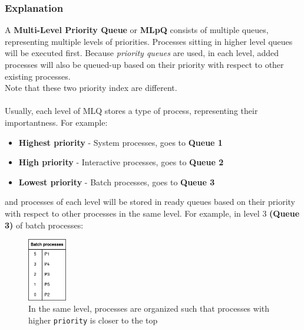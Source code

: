\documentclass[]{article}
\begin{document}
\subsubsection{Explanation}
A \textbf{Multi-Level Priority Queue} or \textbf{MLpQ} consists of multiple queues, representing multiple levels of priorities. Processes sitting in higher level queues will be executed first. Because \textit{priority queues} are used, in each level, added processes will also be queued-up based on their priority with respect to other existing processes.
\\
Note that these two priority index are different.\\
\\
Usually, each level of MLQ stores a type of process, representing their importantness. For example:
\begin{itemize}
	\item \textbf{Highest priority} - System processes, goes to \textbf{Queue 1}
	\item \textbf{High priority} - Interactive processes, goes to \textbf{Queue 2}
	\item \textbf{Lowest priority} - Batch processes, goes to \textbf{Queue 3}
\end{itemize}
and processes of each level will be stored in ready queues based on their priority with respect to other processes in the same level. For example, in level 3 \textbf{(Queue 3)} of batch processes:
\begin{figure}[h]
	\caption{In the same level, processes are organized such that processes with higher \lstinline|priority| is closer to the top}
	\centering
	\includegraphics[width=0.15\textwidth]{content/queue_priority.png}
\end{figure}
\\
\end{document}
